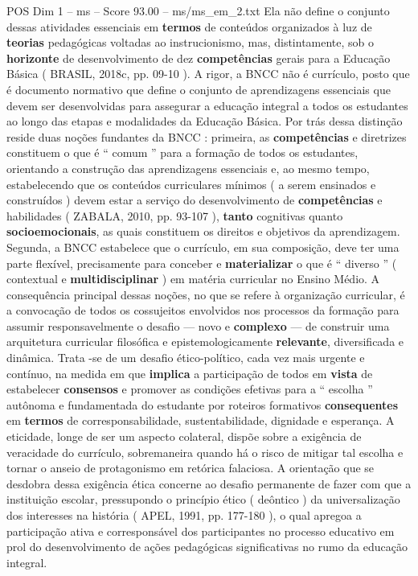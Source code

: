 \begin{textsample}{POS Dim 1 – ms – Score 93.00 – ms/ms\_em\_2.txt}
Ela não define o conjunto dessas atividades essenciais em \textbf{termos} de conteúdos organizados à luz de \textbf{teorias} pedagógicas voltadas ao instrucionismo, mas, distintamente, sob o \textbf{horizonte} de desenvolvimento de dez \textbf{competências} gerais para a Educação Básica ( BRASIL, 2018c, pp. 09-10 ).
A rigor, a BNCC não é currículo, posto que é documento normativo que define o conjunto de aprendizagens essenciais que devem ser desenvolvidas para assegurar a educação integral a todos os estudantes ao longo das etapas e modalidades da Educação Básica.
Por trás dessa distinção reside duas noções fundantes da BNCC : primeira, as \textbf{competências} e diretrizes constituem o que é “ comum ” para a formação de todos os estudantes, orientando a construção das aprendizagens essenciais e, ao mesmo tempo, estabelecendo que os conteúdos curriculares mínimos ( a serem ensinados e construídos ) devem estar a serviço do desenvolvimento de \textbf{competências} e habilidades ( ZABALA, 2010, pp. 93-107 ), \textbf{tanto} cognitivas quanto \textbf{socioemocionais}, as quais constituem os direitos e objetivos da aprendizagem.
Segunda, a BNCC estabelece que o currículo, em sua composição, deve ter uma parte flexível, precisamente para conceber e \textbf{materializar} o que é “ diverso ” ( contextual e \textbf{multidisciplinar} ) em matéria curricular no Ensino Médio.
A consequência principal dessas noções, no que se refere à organização curricular, é a convocação de todos os cossujeitos envolvidos nos processos da formação para assumir responsavelmente o desafio — novo e \textbf{complexo} — de construir uma arquitetura curricular filosófica e epistemologicamente \textbf{relevante}, diversificada e dinâmica.
Trata -se de um desafio ético-político, cada vez mais urgente e contínuo, na medida em que \textbf{implica} a participação de todos em \textbf{vista} de estabelecer \textbf{consensos} e promover as condições efetivas para a “ escolha ” autônoma e fundamentada do estudante por roteiros formativos \textbf{consequentes} em \textbf{termos} de corresponsabilidade, sustentabilidade, dignidade e esperança.
A eticidade, longe de ser um aspecto colateral, dispõe sobre a exigência de veracidade do currículo, sobremaneira quando há o risco de mitigar tal escolha e tornar o anseio de protagonismo em retórica falaciosa.
A orientação que se desdobra dessa exigência ética concerne ao desafio permanente de fazer com que a instituição escolar, pressupondo o princípio ético ( deôntico ) da universalização dos interesses na história ( APEL, 1991, pp. 177-180 ), o qual apregoa a participação ativa e corresponsável dos participantes no processo educativo em prol do desenvolvimento de ações pedagógicas significativas no rumo da educação integral.

\end{textsample}
